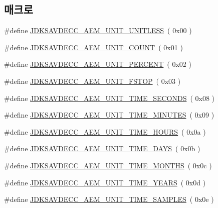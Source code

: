 \subsection*{매크로}
\begin{DoxyCompactItemize}
\item 
\#define \hyperlink{group__units_ga7e2ed3204ac9cfb44613dd623bba391d}{J\+D\+K\+S\+A\+V\+D\+E\+C\+C\+\_\+\+A\+E\+M\+\_\+\+U\+N\+I\+T\+\_\+\+U\+N\+I\+T\+L\+E\+SS}~( 0x00 )
\item 
\#define \hyperlink{group__units_ga3b96b0f9f3c1f39c75d7c71e29f6d234}{J\+D\+K\+S\+A\+V\+D\+E\+C\+C\+\_\+\+A\+E\+M\+\_\+\+U\+N\+I\+T\+\_\+\+C\+O\+U\+NT}~( 0x01 )
\item 
\#define \hyperlink{group__units_ga8be6e08308f13ba43488b4769cba2936}{J\+D\+K\+S\+A\+V\+D\+E\+C\+C\+\_\+\+A\+E\+M\+\_\+\+U\+N\+I\+T\+\_\+\+P\+E\+R\+C\+E\+NT}~( 0x02 )
\item 
\#define \hyperlink{group__units_gae5b5707d79134c1e4084642c69e463db}{J\+D\+K\+S\+A\+V\+D\+E\+C\+C\+\_\+\+A\+E\+M\+\_\+\+U\+N\+I\+T\+\_\+\+F\+S\+T\+OP}~( 0x03 )
\item 
\#define \hyperlink{group__units_ga90f4283eee432192d995051d371e0e8d}{J\+D\+K\+S\+A\+V\+D\+E\+C\+C\+\_\+\+A\+E\+M\+\_\+\+U\+N\+I\+T\+\_\+\+T\+I\+M\+E\+\_\+\+S\+E\+C\+O\+N\+DS}~( 0x08 )
\item 
\#define \hyperlink{group__units_gae25d560b48713a0519c1d67ff1c2252f}{J\+D\+K\+S\+A\+V\+D\+E\+C\+C\+\_\+\+A\+E\+M\+\_\+\+U\+N\+I\+T\+\_\+\+T\+I\+M\+E\+\_\+\+M\+I\+N\+U\+T\+ES}~( 0x09 )
\item 
\#define \hyperlink{group__units_ga63bcec198e4076680942eb83031df260}{J\+D\+K\+S\+A\+V\+D\+E\+C\+C\+\_\+\+A\+E\+M\+\_\+\+U\+N\+I\+T\+\_\+\+T\+I\+M\+E\+\_\+\+H\+O\+U\+RS}~( 0x0a )
\item 
\#define \hyperlink{group__units_gae69341718fefaf2b706b1d85d408f12f}{J\+D\+K\+S\+A\+V\+D\+E\+C\+C\+\_\+\+A\+E\+M\+\_\+\+U\+N\+I\+T\+\_\+\+T\+I\+M\+E\+\_\+\+D\+A\+YS}~( 0x0b )
\item 
\#define \hyperlink{group__units_gafe63a3464bd987cd6f14e90c285b2f52}{J\+D\+K\+S\+A\+V\+D\+E\+C\+C\+\_\+\+A\+E\+M\+\_\+\+U\+N\+I\+T\+\_\+\+T\+I\+M\+E\+\_\+\+M\+O\+N\+T\+HS}~( 0x0c )
\item 
\#define \hyperlink{group__units_ga9fd7e1e664ae06694672db358fb3ce13}{J\+D\+K\+S\+A\+V\+D\+E\+C\+C\+\_\+\+A\+E\+M\+\_\+\+U\+N\+I\+T\+\_\+\+T\+I\+M\+E\+\_\+\+Y\+E\+A\+RS}~( 0x0d )
\item 
\#define \hyperlink{group__units_ga51387cf4ae2488d7e733e2b631892ad3}{J\+D\+K\+S\+A\+V\+D\+E\+C\+C\+\_\+\+A\+E\+M\+\_\+\+U\+N\+I\+T\+\_\+\+T\+I\+M\+E\+\_\+\+S\+A\+M\+P\+L\+ES}~( 0x0e )

\end{DoxyCompactItemize}

